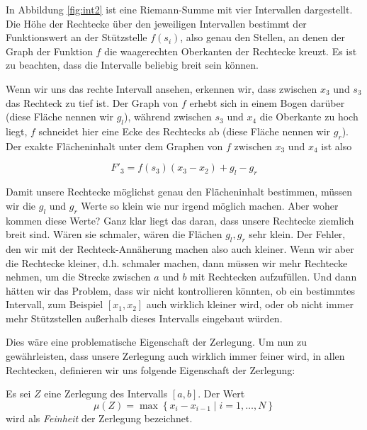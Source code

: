 In Abbildung \ref{fig:int2} ist eine Riemann-Summe mit vier Intervallen dargestellt. Die Höhe der Rechtecke über den jeweiligen Intervallen bestimmt der Funktionswert an der Stützstelle $f(s_i)$, also genau den Stellen, an denen der Graph der Funktion $f$ die waagerechten Oberkanten der Rechtecke kreuzt. Es ist zu beachten, dass die Intervalle beliebig breit sein können.

Wenn wir uns das rechte Intervall ansehen, erkennen wir, dass zwischen $x_3$ und $s_3$ das Rechteck zu tief ist. Der Graph von $f$ erhebt sich in einem Bogen darüber (diese Fläche nennen wir $g_l$), während zwischen $s_3$ und $x_4$ die Oberkante zu hoch liegt, $f$ schneidet hier eine Ecke des Rechtecks ab (diese Fläche nennen wir $g_r$). Der exakte Flächeninhalt unter dem Graphen von $f$ zwischen $x_3$ und $x_4$ ist also

\begin{equation}
F'_3 = f(s_3)(x_3-x_2)+g_l-g_r
\end{equation}

Damit unsere Rechtecke möglichst genau den Flächeninhalt bestimmen, müssen wir die $g_l$ und $g_r$ Werte so klein wie nur irgend möglich machen. Aber woher kommen diese Werte? Ganz klar liegt das daran, dass unsere Rechtecke ziemlich breit sind. Wären sie schmaler, wären die Flächen $g_l,g_r$ sehr klein. Der Fehler, den wir mit der Rechteck-Annäherung machen also auch kleiner. Wenn wir aber die Rechtecke kleiner, d.h. schmaler machen, dann müssen wir mehr Rechtecke nehmen, um die Strecke zwischen $a$ und $b$ mit Rechtecken aufzufüllen. Und dann hätten wir das Problem, dass wir nicht kontrollieren könnten, ob ein bestimmtes Intervall, zum Beispiel $[x_1,x_2]$ auch wirklich kleiner wird, oder ob nicht immer mehr Stützstellen außerhalb dieses Intervalls eingebaut würden. 

Dies wäre eine problematische Eigenschaft der Zerlegung. Um nun zu gewährleisten, dass unsere Zerlegung auch wirklich immer feiner wird, in allen Rechtecken, definieren wir uns folgende Eigenschaft der Zerlegung:

\begin{definition}
Es sei $Z$ eine Zerlegung des Intervalls $[a,b]$. Der Wert
\begin{equation}
\mu (Z) = \max\left\{ x_{i}-x_{i-1} \middle| i=1,\dots ,N  \right\}
\end{equation}
wird als \emph{Feinheit} der Zerlegung bezeichnet.
\end{definition}

